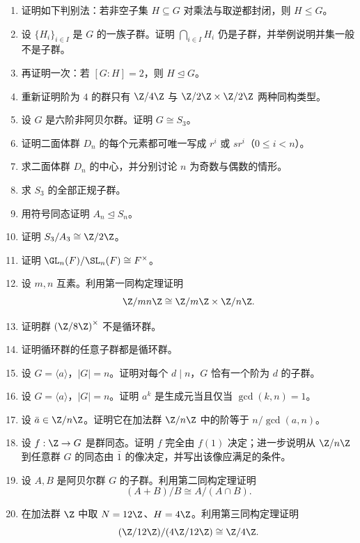 \begin{enumerate}[start=31, label=\textbf{习题6.\arabic*.}, leftmargin=7em]
  \item \medium 证明如下判别法：若非空子集 $H\subseteq G$ 对乘法与取逆都封闭，则 $H\le G$。
  \item \medium 设 $\{H_i\}_{i\in I}$ 是 $G$ 的一族子群。证明 $\bigcap_{i\in I}H_i$ 仍是子群，并举例说明并集一般不是子群。
  \item \medium 再证明一次：若 $[G:H]=2$，则 $H\trianglelefteq G$。
  \item \medium 重新证明阶为 $4$ 的群只有 $\Z/4\Z$ 与 $\Z/2\Z\times\Z/2\Z$ 两种同构类型。
  \item \medium 设 $G$ 是六阶非阿贝尔群。证明 $G\cong S_3$。
  \item \medium 证明二面体群 $D_n$ 的每个元素都可唯一写成 $r^i$ 或 $sr^i$（$0\le i<n$）。
  \item \medium 求二面体群 $D_n$ 的中心，并分别讨论 $n$ 为奇数与偶数的情形。
  \item \medium 求 $S_3$ 的全部正规子群。
  \item \medium 用符号同态证明 $A_n\trianglelefteq S_n$。
  \item \medium 证明 $S_3/A_3 \cong \Z/2\Z$。
  \item \medium 证明 $\GL_n(F)/\SL_n(F) \cong F^\times$。
  \item \medium 设 $m,n$ 互素。利用第一同构定理证明
  \[
    \Z/mn\Z \cong \Z/m\Z \times \Z/n\Z.
  \]
  \item \medium 证明群 $\left(\Z/8\Z\right)^\times$ 不是循环群。
  \item \medium 证明循环群的任意子群都是循环群。
  \item \medium 设 $G=\langle a \rangle$，$|G|=n$。证明对每个 $d\mid n$，$G$ 恰有一个阶为 $d$ 的子群。
  \item \medium 设 $G=\langle a \rangle$，$|G|=n$。证明 $a^k$ 是生成元当且仅当 $\gcd(k,n)=1$。
  \item \medium 设 $\bar a\in \Z/n\Z$。证明它在加法群 $\Z/n\Z$ 中的阶等于 $n/\gcd(a,n)$。
  \item \medium 设 $f:\Z\to G$ 是群同态。证明 $f$ 完全由 $f(1)$ 决定；进一步说明从 $\Z/n\Z$ 到任意群 $G$ 的同态由 $\bar 1$ 的像决定，并写出该像应满足的条件。
  \item \medium 设 $A,B$ 是阿贝尔群 $G$ 的子群。利用第二同构定理证明
  \[
    (A+B)/B \cong A/(A\cap B).
  \]
  \item \medium 在加法群 $\Z$ 中取 $N=12\Z$、$H=4\Z$。利用第三同构定理证明
  \[
    (\Z/12\Z)/(4\Z/12\Z) \cong \Z/4\Z.
\]
\end{enumerate}
